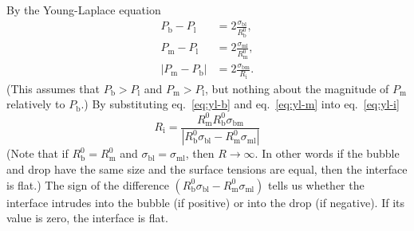 \documentclass{article}
\begin{document}
By the Young-Laplace equation
\begin{align}
    P_\text{b} - P_\text{l} &= 2\frac{\sigma_\text{bl}}{R^0_\text{b}}
    \label{eq:yl-b}
    ,\\
    P_\text{m} - P_\text{l} &= 2\frac{\sigma_\text{ml}}{R^0_\text{m}}
    \label{eq:yl-m}
    ,\\
    \left| P_\text{m} - P_\text{b} \right| &= 2\frac{\sigma_\text{bm}}{R_\text{i}}
    \label{eq:yl-i}
    .
\end{align}
(This assumes that $P_\text{b}>P_\text{l}$ and $P_\text{m}>P_\text{l}$,
but nothing about the magnitude of $P_\text{m}$ relatively to $P_\text{b}$.)
By substituting eq.~\ref{eq:yl-b} and eq.~\ref{eq:yl-m} into eq.~\ref{eq:yl-i}
\begin{equation}
    R_\text{i} = \frac
        {R^0_\text{m}R^0_\text{b}\sigma_\text{bm}}
        {\left| R^0_\text{b}\sigma_\text{bl} - R^0_\text{m}\sigma_\text{ml} \right| }
        \label{eq:ri}
\end{equation}
(Note that if $R^0_\text{b}=R^0_\text{m}$ and $\sigma_\text{bl} = \sigma_\text{ml}$,
then $R\rightarrow \infty$. In other words if the bubble and drop have the same
size and the surface tensions are equal, then the interface is flat.)
The sign of the difference $(R^0_\text{b}\sigma_\text{bl} - R^0_\text{m}\sigma_\text{ml})$ tells us 
whether the interface intrudes into the bubble (if positive) or into the drop 
(if negative). If its value is zero, the interface is flat.
\end{document}

